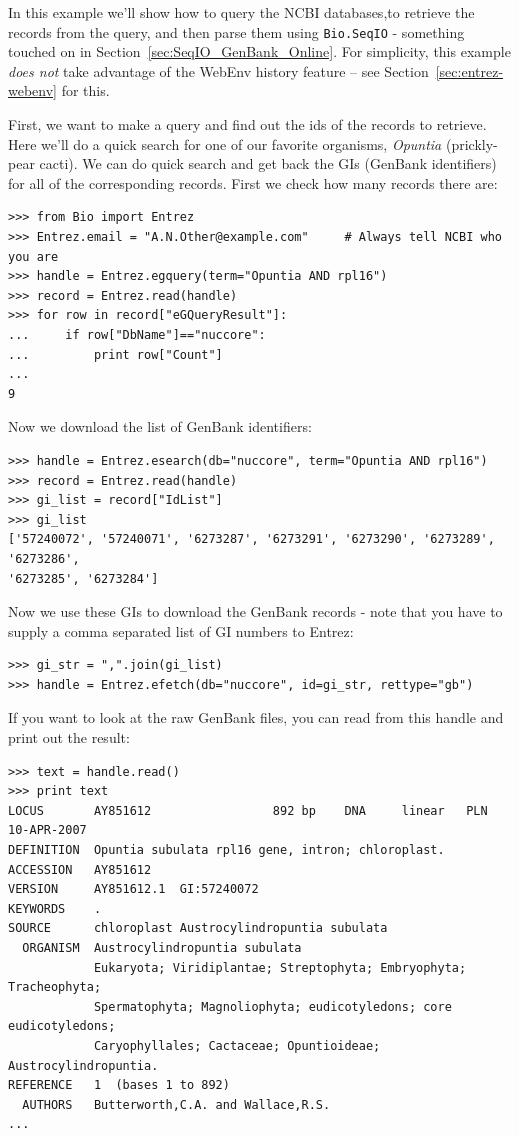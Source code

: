 \documentclass{report}
\begin{document}
In this example we'll show how to query the NCBI databases,to retrieve the records from the query, and then parse them using \verb+Bio.SeqIO+  - something touched on in Section~\ref{sec:SeqIO_GenBank_Online}.
For simplicity, this example \emph{does not} take advantage of the WebEnv history feature -- see Section~\ref{sec:entrez-webenv} for this.

First, we want to make a query and find out the ids of the records to retrieve. Here we'll do a quick search for one of our favorite organisms, \emph{Opuntia} (prickly-pear cacti). We can do quick search and get back the GIs (GenBank identifiers) for all of the corresponding records. First we check how many records there are:

\begin{verbatim}
>>> from Bio import Entrez
>>> Entrez.email = "A.N.Other@example.com"     # Always tell NCBI who you are
>>> handle = Entrez.egquery(term="Opuntia AND rpl16")
>>> record = Entrez.read(handle)
>>> for row in record["eGQueryResult"]:
...     if row["DbName"]=="nuccore":
...         print row["Count"]
...
9
\end{verbatim}
Now we download the list of GenBank identifiers:
\begin{verbatim}
>>> handle = Entrez.esearch(db="nuccore", term="Opuntia AND rpl16")
>>> record = Entrez.read(handle)
>>> gi_list = record["IdList"]
>>> gi_list
['57240072', '57240071', '6273287', '6273291', '6273290', '6273289', '6273286',
'6273285', '6273284']
\end{verbatim}

Now we use these GIs to download the GenBank records - note that you have to supply a comma separated list of GI numbers to Entrez:

\begin{verbatim}
>>> gi_str = ",".join(gi_list)
>>> handle = Entrez.efetch(db="nuccore", id=gi_str, rettype="gb")
\end{verbatim}

If you want to look at the raw GenBank files, you can read from this handle and print out the result:

\begin{verbatim}
>>> text = handle.read()
>>> print text
LOCUS       AY851612                 892 bp    DNA     linear   PLN 10-APR-2007
DEFINITION  Opuntia subulata rpl16 gene, intron; chloroplast.
ACCESSION   AY851612
VERSION     AY851612.1  GI:57240072
KEYWORDS    .
SOURCE      chloroplast Austrocylindropuntia subulata
  ORGANISM  Austrocylindropuntia subulata
            Eukaryota; Viridiplantae; Streptophyta; Embryophyta; Tracheophyta;
            Spermatophyta; Magnoliophyta; eudicotyledons; core eudicotyledons;
            Caryophyllales; Cactaceae; Opuntioideae; Austrocylindropuntia.
REFERENCE   1  (bases 1 to 892)
  AUTHORS   Butterworth,C.A. and Wallace,R.S.
...
\end{verbatim}
\end{document}
